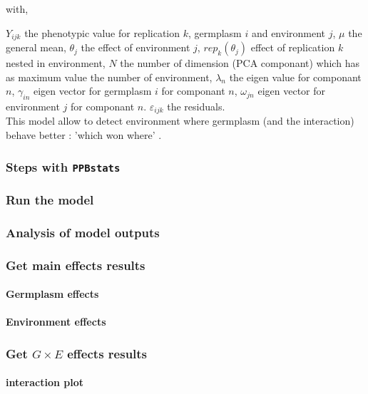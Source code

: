 \documentclass{article}\usepackage[]{graphicx}\usepackage[]{color}
\newcommand{\pack}{\texttt{PPBstats}}
\begin{document}
with,

$Y_{ijk}$ the phenotypic value for replication $k$, germplasm $i$ and environment $j$,
$\mu$ the general mean,
$\theta_{j}$ the effect of environment $j$,
$rep_{k}(\theta_{j})$ effect of replication $k$ nested in environment,
$N$ the number of dimension (PCA componant) which has as maximum value the number of environment,
$\lambda_{n}$ the eigen value for componant $n$,
$\gamma_{in}$ eigen vector for germplasm $i$ for componant $n$,
$\omega_{jn}$ eigen vector for  environment $j$  for componant $n$.
$\varepsilon_{ijk}$ the residuals.\\

This model allow to detect environment where germplasm (and the interaction) behave better : 'which won where' \citep{gauch_statistical_2008,yan_gge_2007}.

\subsubsection{Steps with \pack}


\subsubsection{Run the model}


\subsubsection{Analysis of model outputs}


\subsubsection{Get main effects results}

\paragraph{Germplasm effects}

\paragraph{Environment effects}

\subsubsection{Get $G \times E$ effects results}

\paragraph{interaction plot}
\end{document}
